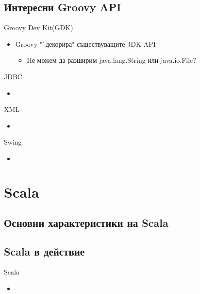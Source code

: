 \documentclass[compress,red]{beamer}
\begin{document}
\subsection{Интересни Groovy API}
\begin{frame}{Groovy Dev Kit(GDK)}
  \transdissolve
  \begin{itemize}
  \item Groovy "`декорира" съществуващите JDK API
  \begin{itemize}
    \item Не можем да разширим java.lang.String или java.io.File?
  \end{itemize}

  \end{itemize}
\end{frame}

\begin{frame}{JDBC}
  \transdissolve
  \begin{itemize}
  \item 
  \end{itemize}
\end{frame}

\begin{frame}{XML}
  \transdissolve
  \begin{itemize}
  \item 
  \end{itemize}
\end{frame}

\begin{frame}{Swing}
  \transdissolve
  \begin{itemize}
  \item 
  \end{itemize}
\end{frame}


\section{Scala}
\subsection{Основни характеристики на Scala}
\subsection{Scala в действие}

\begin{frame}{Scala}
  \transdissolve
  \begin{itemize}
  \item 
  \end{itemize}
\end{frame}
\end{document}
